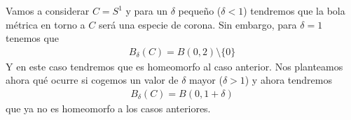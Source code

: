 \begin{observacion}
    Vamos a considerar $C=S^1$ y para un $\delta$ pequeño ($\delta<1$) tendremos que la bola métrica en torno a $C$ será una especie de corona. Sin embargo, para $\delta=1$ tenemos que
    \begin{gather*}
        B_\delta(C) = B(0,2) \setminus \{0\}
    \end{gather*}
    Y en este caso tendremos que es homeomorfo al caso anterior. Nos planteamos ahora qué ocurre si cogemos un valor de $\delta$ mayor ($\delta>1$) y ahora tendremos
    \begin{gather*}
        B_\delta(C) = B(0,1+\delta)
    \end{gather*}
    que ya no es homeomorfo a los casos anteriores.

    \begin{figure}[H]
        \centering
        \begin{subfigure}[b]{0.32\textwidth}
            \centering
        \end{subfigure}
        \hfill
        \begin{subfigure}[b]{0.32\textwidth}
            \centering
\end{subfigure}
\end{figure}
\end{observacion}
